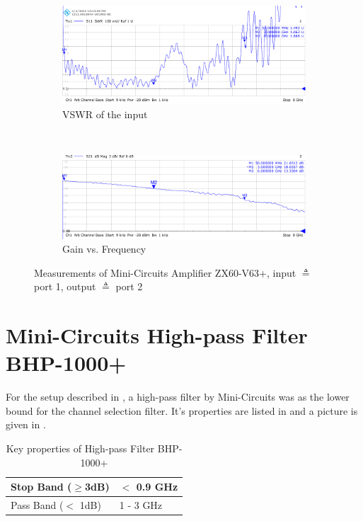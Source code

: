 \begin{figure}[p]
  \centering
  \begin{subfigure}{0.45\textwidth}
    \centering
    \includegraphics[width=\textwidth]{figures/network_analyzer/MCL_ZX60-V63+_Amplifier_S11_id1}
    \caption{\gls{VSWR} of the input}
  \end{subfigure}
  ~
  \begin{subfigure}{0.45\textwidth}
    \centering
    \includegraphics[width=\textwidth]{figures/network_analyzer/MCL_ZX60-V63+_Amplifier_S21_id1}
    \caption{Gain vs. Frequency}
  \end{subfigure}
  \caption{Measurements of Mini-Circuits Amplifier ZX60-V63+,
    input $\triangleq$ port 1, output $\triangleq$ port 2}
  \label{fig:comp_zx60_meas}
\end{figure}

\section{Mini-Circuits High-pass Filter BHP-1000+}
For the setup described in , a high-pass filter
by Mini-Circuits was as the lower bound for the channel selection filter.
It's properties are listed in  and a picture is given in
.

\begin{table}[h]
  \centering
  \begin{tabular}{|l|l|}
    \hline
    Stop Band ($\geq$3dB) & $<$ 0.9 GHz \\ \hline
    Pass Band ($<$ 1dB) & 1 - 3 GHz \\ \hline
  \end{tabular}
  \caption{Key properties of High-pass Filter BHP-1000+ \cite{mc_bhp1000}}
  \label{tab:comp_bhp1000}
\end{table}

